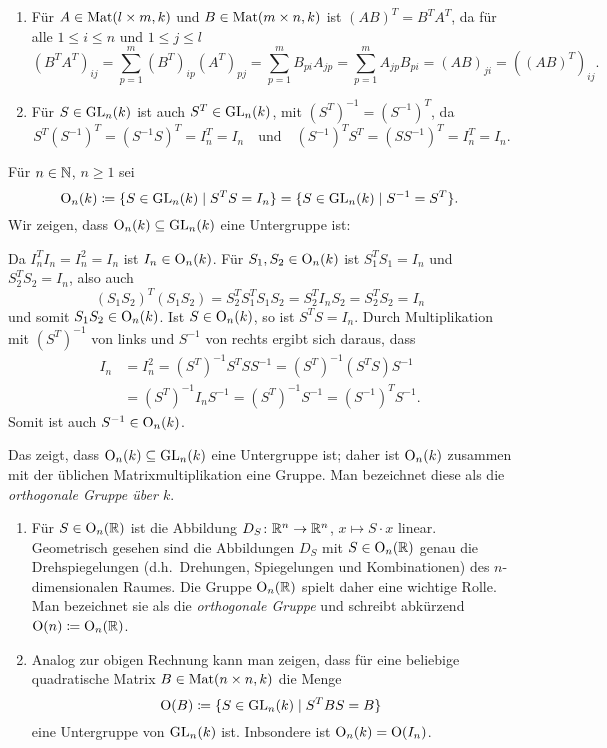 \begin{bem}
 \begin{enumerate}[leftmargin=*]
  \item
   Für $A \in \mathrm{Mat}(l \times m, k)$ und $B \in \mathrm{Mat}(m \times n, k)$ ist $(AB)^T = B^T A^T$, da für alle $1 \leq i \leq n$ und $1 \leq j \leq l$
   \[
    (B^T A^T)_{ij}
    = \sum_{p=1}^m (B^T)_{ip} (A^T)_{pj}
    = \sum_{p=1}^m B_{pi} A_{jp}
    = \sum_{p=1}^m A_{jp} B_{pi}
    = (AB)_{ji}
    = ((AB)^T)_{ij}.
   \]
  \item
   Für $S \in \mathrm{GL}_n(k)$ ist auch $S^T \in \mathrm{GL}_n(k)$, mit $(S^T)^{-1} = (S^{-1})^T$, da
   \[
    S^T (S^{-1})^T = (S^{-1} S)^T = I_n^T = I_n
    \quad\text{und}\quad
    (S^{-1})^T S^T = (S S^{-1})^T = I_n^T = I_n.
   \]
 \end{enumerate}
\end{bem}

Für $n \in \mathbb{N}$, $n \geq 1$ sei
\[
 \mathrm{O}_n(k)
 \coloneqq \{S \in \mathrm{GL}_n(k) \mid S^T S = I_n\}
 = \{S \in \mathrm{GL}_n(k) \mid S^{-1} = S^T\}.
\]
Wir zeigen, dass $\mathrm{O}_n(k) \subseteq \mathrm{GL}_n(k)$ eine Untergruppe ist:

Da $I_n^T I_n = I_n^2 = I_n$ ist $I_n \in \mathrm{O}_n(k)$. Für $S_1, S_2 \in \mathrm{O}_n(k)$ ist $S_1^T S_1 = I_n$ und $S_2^T S_2 = I_n$, also auch
\[
 (S_1 S_2)^T (S_1 S_2)
 = S_2^T S_1^T S_1 S_2
 = S_2^T I_n S_2
 = S_2^T S_2
 = I_n
\]
und somit $S_1 S_2 \in \mathrm{O}_n(k)$. Ist $S \in \mathrm{O}_n(k)$, so ist $S^T S = I_n$. Durch Multiplikation mit $(S^T)^{-1}$ von links und $S^{-1}$ von rechts ergibt sich daraus, dass
\begin{align*}
 I_n
 &= I_n^2
 = (S^T)^{-1} S^T S S^{-1}
 = (S^T)^{-1} (S^T S) S^{-1} \\
 &= (S^T)^{-1} I_n S^{-1}
 = (S^T)^{-1} S^{-1}
 = (S^{-1})^T S^{-1}.
\end{align*}
Somit ist auch $S^{-1} \in \mathrm{O}_n(k)$.

Das zeigt, dass $\mathrm{O}_n(k) \subseteq \mathrm{GL}_n(k)$ eine Untergruppe ist; daher ist $\mathrm{O}_n(k)$ zusammen mit der üblichen Matrixmultiplikation eine Gruppe. Man bezeichnet diese als die \emph{orthogonale Gruppe über $k$}.

\begin{bem}
 \begin{enumerate}[leftmargin=*]
  \item
   Für $S \in \mathrm{O}_n(\mathbb{R})$ ist die Abbildung $D_S \colon \mathbb{R}^n \to \mathbb{R}^n$, $x \mapsto S \cdot x$ linear. Geometrisch gesehen sind die Abbildungen $D_S$ mit $S \in \mathrm{O}_n(\mathbb{R})$ genau die Drehspiegelungen (d.h.\ Drehungen, Spiegelungen und Kombinationen) des $n$-dimensionalen Raumes. Die Gruppe $\mathrm{O}_n(\mathbb{R})$ spielt daher eine wichtige Rolle. Man bezeichnet sie als die \emph{orthogonale Gruppe} und schreibt abkürzend $\mathrm{O}(n) \coloneqq \mathrm{O}_n(\mathbb{R})$.
  \item
   Analog zur obigen Rechnung kann man zeigen, dass für eine beliebige quadratische Matrix $B \in \mathrm{Mat}(n \times n, k)$ die Menge
   \[
    \mathrm{O}(B) \coloneqq \{S \in \mathrm{GL}_n(k) \mid S^T B S = B\}
   \]
   eine Untergruppe von $\mathrm{GL}_n(k)$ ist. Inbsondere ist $\mathrm{O}_n(k) = \mathrm{O}(I_n)$.
 \end{enumerate}
\end{bem}



